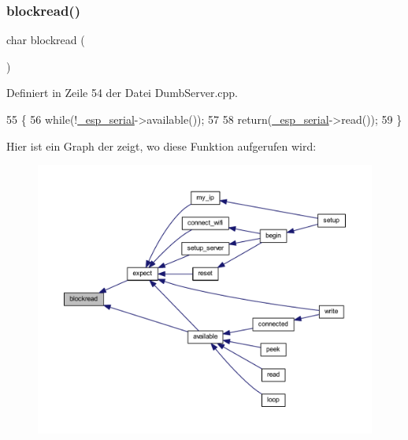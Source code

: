 \subsubsection{\texorpdfstring{blockread()}{blockread()}}
{\footnotesize\ttfamily char blockread (\begin{DoxyParamCaption}{ }\end{DoxyParamCaption})\hspace{0.3cm}{\ttfamily [private]}}



Definiert in Zeile 54 der Datei Dumb\+Server.\+cpp.


\begin{DoxyCode}
55 \{
56   \textcolor{keywordflow}{while}(!\hyperlink{class_esp_server_a552aab874ad99b696f4c997d6f5a4746}{\_esp\_serial}->available());
57 
58   \textcolor{keywordflow}{return}(\hyperlink{class_esp_server_a552aab874ad99b696f4c997d6f5a4746}{\_esp\_serial}->read());
59 \}
\end{DoxyCode}
Hier ist ein Graph der zeigt, wo diese Funktion aufgerufen wird\+:\nopagebreak
\begin{figure}[H]
\begin{center}
\leavevmode
\includegraphics[width=350pt]{class_esp_server_ac2b4ae3c7ebcd751c4c8020412fa3270_icgraph}
\end{center}
\end{figure}
\mbox{\label{class_esp_server_a504393c8aa6394b2d0631146425bf011}} 
